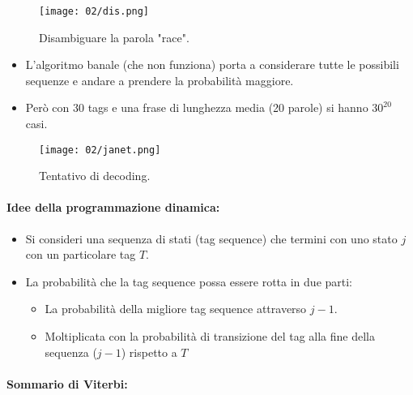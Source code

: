 \begin{figure}[h]
    \centering
    \texttt{[image: 02/dis.png]}
    \caption{Disambiguare la parola "race".}
\end{figure}



\begin{itemize}
  \item L'algoritmo banale (che non funziona) porta a considerare tutte le possibili sequenze e andare a prendere la probabilità maggiore. 
  \item Però con 30 tags e una frase di lunghezza media (20 parole) si hanno $30^{20}$ casi. 
\end{itemize}

\begin{figure}[h]
    \centering
    \texttt{[image: 02/janet.png]}
    \caption{Tentativo di decoding.}
\end{figure}

\paragraph{Idee della programmazione dinamica:}

\begin{itemize}
  \item Si consideri una sequenza di stati (tag sequence) che termini con uno stato $j$ con un particolare tag $T$. 
  \item La probabilità che la tag sequence possa essere rotta in due parti: 
    \begin{itemize}
      \item La probabilità della migliore tag sequence attraverso $j - 1$. 
      \item Moltiplicata con la probabilità di transizione del tag alla fine della sequenza ($j-1$) rispetto a $T$
    \end{itemize}
\end{itemize}

\paragraph{Sommario di Viterbi:}

